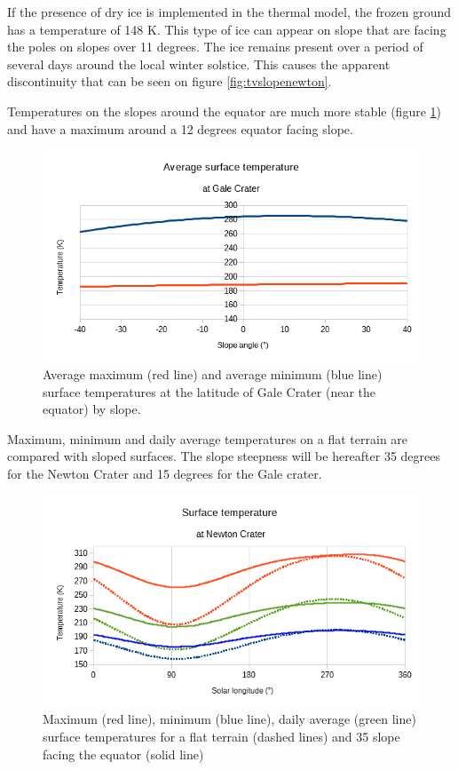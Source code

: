 \documentclass{report}
\begin{document}
If the presence of dry ice is implemented in the thermal model, the frozen ground has a temperature of 148 K. This type of ice can appear on slope that are facing the poles on slopes over 11 degrees. The ice remains present over a period of several days around the local winter solstice. This causes the apparent discontinuity that can be seen on figure \ref{fig:tvslopenewton}. 

Temperatures on the slopes around the equator are much more stable (figure \ref{tvslopegale}) and have a maximum around a 12 degrees equator facing slope.\\ 

\begin{figure}
    \centering
    \includegraphics[width=.9\textwidth]{graphs/0108-gale-tvslope.png}
    \caption{Average maximum (red line) and average minimum (blue line) surface temperatures at the latitude of Gale Crater (near the equator) by slope.}
    \label{tvslopegale}
\end{figure}{}

Maximum, minimum and daily average temperatures on a flat terrain are compared with sloped surfaces. The slope steepness will be hereafter 35 degrees for the Newton Crater and 15 degrees for the Gale crater.  \\
\begin{figure}
    \centering
    \includegraphics[width=.9\textwidth]{graphs/0108-newton-tempannu-flat.png}
    \caption{Maximum (red line), minimum (blue line), daily average (green line) surface temperatures for a flat terrain (dashed lines) and 35 \degree slope facing the equator (solid line)}
    \label{tempannunewton}
\end{figure}{}
\end{document}
